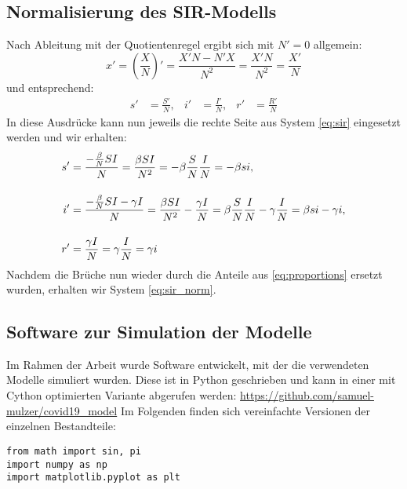 \documentclass[../main.tex]{subfiles}
\begin{document}
    \subsection*{Normalisierung des SIR-Modells}
    \label{ap:normalization}
    Nach Ableitung mit der Quotientenregel ergibt sich mit $N' = 0$ allgemein:
    \begin{equation*}
        x' = \left(\frac{X}{N}\right)' = \frac{X'N-N'X}{N^2} = \frac{X'N}{N^2} = \frac{X'}{N}
    \end{equation*}
    und entsprechend:
    \begin{equation*}
        \begin{aligned}
            s' &= \frac{S'}{N}, & i' &= \frac{I'}{N}, & r' &= \frac{R'}{N}
        \end{aligned}
    \end{equation*}
    In diese Ausdrücke kann nun jeweils die rechte Seite aus System \eqref{eq:sir} eingesetzt werden und wir erhalten: 
    \begin{equation*}
        \setlength{\jot}{0.5cm}
        \begin{aligned}
            s' &= \frac{-\frac{\beta}{N}SI}{N} = \frac{\beta SI}{N^2} = -\beta\frac{S}{N}\frac{I}{N} = -\beta si, \\
            i' &= \frac{-\frac{\beta}{N}SI-\gamma I}{N} = \frac{\beta SI}{N^2} - \frac{\gamma I}{N} = \beta\frac{S}{N}\frac{I}{N} -\gamma\frac{I}{N} = \beta si - \gamma i, \\
            r' &= \frac{\gamma I}{N} = \gamma\frac{I}{N} = \gamma i
        \end{aligned}
    \end{equation*}
    Nachdem die Brüche nun wieder durch die Anteile aus \eqref{eq:proportions} ersetzt wurden, erhalten wir System \eqref{eq:sir_norm}.
    
    
    \subsection*{Software zur Simulation der Modelle}
    \label{ap:simulation}
    Im Rahmen der Arbeit wurde Software entwickelt, mit der  die verwendeten Modelle simuliert wurden. Diese ist in Python geschrieben und kann in einer mit Cython optimierten Variante abgerufen werden: \url{https://github.com/samuel-mulzer/covid19_model}
    Im Folgenden finden sich vereinfachte Versionen der einzelnen Bestandteile:

\begin{lstlisting}[title=Importierung der verwendeten Programmbibliotheken:]
from math import sin, pi
import numpy as np
import matplotlib.pyplot as plt
\end{lstlisting}
\end{document}
